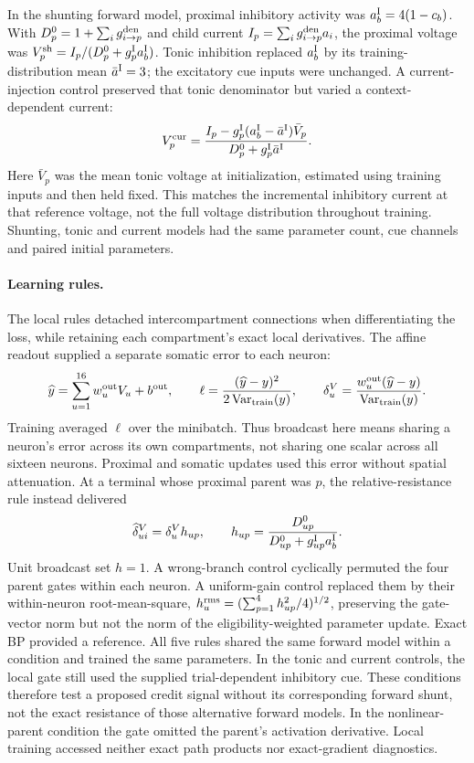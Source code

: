 In the shunting forward model, proximal inhibitory activity was
$a_b^{\rm I}=4(1-c_b)$. With $D_p^0=1+\sum_i g_{i\to p}^{\rm den}$ and child current
$I_p=\sum_i g_{i\to p}^{\rm den}a_i$, the proximal voltage was
$V_p^{\rm sh}=I_p/(D_p^0+g_p^{\rm I}a_b^{\rm I})$. Tonic inhibition replaced
$a_b^{\rm I}$ by its training-distribution mean $\bar a^{\rm I}=3$; the excitatory cue inputs
were unchanged. A current-injection control preserved that tonic denominator
but varied a context-dependent current:
\begin{equation}
V_p^{\rm cur}=
\frac{I_p-g_p^{\rm I}(a_b^{\rm I}-\bar a^{\rm I})\bar V_p}
     {D_p^0+g_p^{\rm I}\bar a^{\rm I}}.
\end{equation}
Here $\bar V_p$ was the mean tonic voltage at initialization, estimated
using training inputs and then held fixed. This matches the incremental
inhibitory current at that reference voltage, not the full voltage
distribution throughout training. Shunting, tonic and current models had
the same parameter count, cue channels and paired initial parameters.

\paragraph{Learning rules.}
The local rules detached intercompartment connections when differentiating
the loss, while retaining each compartment's exact local derivatives.
The affine readout supplied a separate somatic error to each neuron:
\begin{equation}
\widehat y=\sum_{u=1}^{16}w_u^{\rm out}V_u+b^{\rm out},\qquad
\ell=\frac{(\widehat y-y)^2}{2\operatorname{Var}_{\rm train}(y)},\qquad
\delta_u^V=\frac{w_u^{\rm out}(\widehat y-y)}{\operatorname{Var}_{\rm train}(y)}.
\end{equation}
Training averaged $\ell$ over the minibatch. Thus broadcast here means
sharing a neuron's error across its own compartments, not sharing one
scalar across all sixteen neurons.
Proximal and somatic updates used this error without spatial attenuation.
At a terminal whose proximal parent was $p$, the relative-resistance rule
instead delivered
\begin{equation}
\widehat\delta_{ui}^V=\delta_u^V h_{up},\qquad
h_{up}=\frac{D_{up}^0}{D_{up}^0+g_{up}^{\rm I}a_b^{\rm I}}.
\label{eq:si_dendrinet_gate}
\end{equation}
Unit broadcast set $h=1$. A wrong-branch control cyclically permuted
the four parent gates within each neuron. A uniform-gain control replaced
them by their within-neuron root-mean-square,
$h_u^{\rm rms}=(\sum_{p=1}^4h_{up}^2/4)^{1/2}$, preserving
the gate-vector norm but not the norm of the eligibility-weighted parameter
update. Exact BP provided a reference. All five rules shared the same
forward model within a condition and trained the same parameters.
In the tonic and current controls, the local gate still used the supplied
trial-dependent inhibitory cue. These conditions therefore test a proposed
credit signal without its corresponding forward shunt, not the exact
resistance of those alternative forward models. In the nonlinear-parent
condition the gate omitted the parent's activation derivative. Local
training accessed neither exact path products nor exact-gradient diagnostics.

